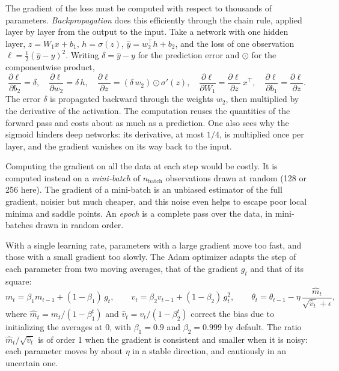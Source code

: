\documentclass[11pt,a4paper]{article}
\begin{document}
The gradient of the loss must be computed with respect to thousands of parameters. \emph{Backpropagation} does this
efficiently through the chain rule, applied layer by layer from the output to the input. Take a network with one
hidden layer, $z = W_1 x + b_1$, $h = \sigma(z)$, $\hat y = w_2^\top h + b_2$, and the loss of one observation
$\ell = \frac12(\hat y - y)^2$. Writing $\delta = \hat y - y$ for the prediction error and $\odot$ for the componentwise
product,
\[
\frac{\partial \ell}{\partial b_2} = \delta, \quad
\frac{\partial \ell}{\partial w_2} = \delta\,h, \quad
\frac{\partial \ell}{\partial z} = (\delta\,w_2) \odot \sigma'(z), \quad
\frac{\partial \ell}{\partial W_1} = \frac{\partial \ell}{\partial z}\,x^\top, \quad
\frac{\partial \ell}{\partial b_1} = \frac{\partial \ell}{\partial z} .
\]
The error $\delta$ is propagated backward through the weights $w_2$, then multiplied by the derivative of the
activation. The computation reuses the quantities of the forward pass and costs about as much as a prediction. One also
sees why the sigmoid hinders deep networks: its derivative, at most $1/4$, is multiplied once per layer, and the
gradient vanishes on its way back to the input.

Computing the gradient on all the data at each step would be costly. It is computed instead on a \emph{mini-batch} of
$n_{\text{batch}}$ observations drawn at random (128 or 256 here). The gradient of a mini-batch is an unbiased estimator
of the full gradient, noisier but much cheaper, and this noise even helps to escape poor local minima and saddle
points. An \emph{epoch} is a complete pass over the data, in mini-batches drawn in random order.

With a single learning rate, parameters with a large gradient move too fast, and those with a small gradient too
slowly. The Adam optimizer \citep{kingma2015} adapts the step of each parameter from two moving averages, that of the
gradient $g_t$ and that of its square:
\[
m_t = \beta_1 m_{t-1} + (1 - \beta_1)\,g_t, \qquad v_t = \beta_2 v_{t-1} + (1 - \beta_2)\,g_t^2, \qquad
\theta_t = \theta_{t-1} - \eta\,\frac{\hat m_t}{\sqrt{\hat v_t} + \epsilon},
\]
where $\hat m_t = m_t/(1 - \beta_1^t)$ and $\hat v_t = v_t/(1 - \beta_2^t)$ correct the bias due to initializing the
averages at 0, with $\beta_1 = 0.9$ and $\beta_2 = 0.999$ by default. The ratio $\hat m_t/\sqrt{\hat v_t}$ is of order 1
when the gradient is consistent and smaller when it is noisy: each parameter moves by about $\eta$ in a stable
direction, and cautiously in an uncertain one.
\end{document}
